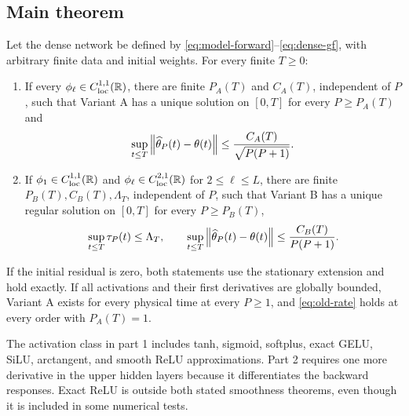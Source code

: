 \subsection{Main theorem}

\begin{theorem}
\label{thm:main}
Let the dense network be defined by
\eqref{eq:model-forward}--\eqref{eq:dense-gf}, with arbitrary finite data and
initial weights.  For every finite $T\ge0$:
\begin{enumerate}[leftmargin=*]
\item If every $\phi_\ell\in C^{1,1}_{\mathrm{loc}}(\mathbb R)$, there are finite
      $P_A(T)$ and $C_A(T)$, independent of $P$, such that Variant A has a
      unique solution on $[0,T]$ for every $P\ge P_A(T)$ and
      \begin{equation}
       \sup_{t\le T}\left\lVert \widehat\theta_P(t)-\theta(t)\right\rVert
       \le\frac{C_A(T)}{\sqrt{P(P+1)}}.
       \label{eq:old-rate}
      \end{equation}
\item If $\phi_1\in C^{1,1}_{\mathrm{loc}}(\mathbb R)$ and
      $\phi_\ell\in C^{2,1}_{\mathrm{loc}}(\mathbb R)$ for $2\le\ell\le L$, there
      are finite $P_B(T),C_B(T),\Lambda_T$, independent of $P$, such that
      Variant B has a unique regular solution on $[0,T]$ for every
      $P\ge P_B(T)$,
      \begin{equation}
       \sup_{t\le T}\tau_P(t)\le\Lambda_T,
       \qquad
       \sup_{t\le T}\left\lVert \widehat\theta_P(t)-\theta(t)\right\rVert
       \le\frac{C_B(T)}{P(P+1)}.
       \label{eq:new-rate}
      \end{equation}
\end{enumerate}
If the initial residual is zero, both statements use the stationary extension
and hold exactly.  If all activations and their first derivatives are globally
bounded, Variant A exists for every physical time at every $P\ge1$, and
\eqref{eq:old-rate} holds at every order with $P_A(T)=1$.
\end{theorem}

The activation class in part 1 includes tanh, sigmoid, softplus, exact GELU,
SiLU, arctangent, and smooth ReLU approximations.  Part 2 requires one more
derivative in the upper hidden layers because it differentiates the backward
responses.  Exact ReLU is outside both stated smoothness theorems, even though
it is included in some numerical tests.

